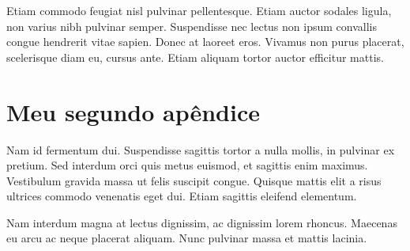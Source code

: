 \documentclass[sigconf]{acmart}
\begin{document}
Etiam commodo feugiat nisl pulvinar pellentesque. Etiam auctor sodales
ligula, non varius nibh pulvinar semper. Suspendisse nec lectus non
ipsum convallis congue hendrerit vitae sapien. Donec at laoreet
eros. Vivamus non purus placerat, scelerisque diam eu, cursus
ante. Etiam aliquam tortor auctor efficitur mattis.

\section{Meu segundo apêndice}

Nam id fermentum dui. Suspendisse sagittis tortor a nulla mollis, in
pulvinar ex pretium. Sed interdum orci quis metus euismod, et sagittis
enim maximus. Vestibulum gravida massa ut felis suscipit
congue. Quisque mattis elit a risus ultrices commodo venenatis eget
dui. Etiam sagittis eleifend elementum.

Nam interdum magna at lectus dignissim, ac dignissim lorem
rhoncus. Maecenas eu arcu ac neque placerat aliquam. Nunc pulvinar
massa et mattis lacinia.
\end{document}

